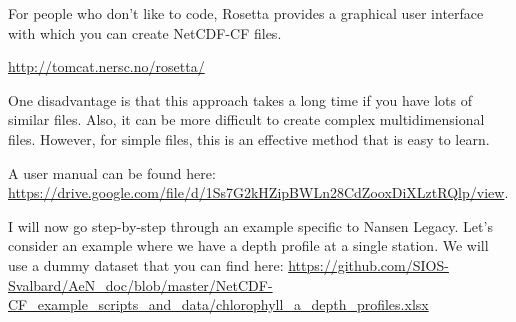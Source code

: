 \documentclass[a4paper,english, 11pt]{article}
\begin{document}
For people who don't like to code, Rosetta provides a graphical user interface with which you can create NetCDF-CF files.

\url{http://tomcat.nersc.no/rosetta/}

One disadvantage is that this approach takes a long time if you have lots of similar files. Also, it can be more difficult to create complex multidimensional files. However, for simple files, this is an effective method that is easy to learn.

A user manual can be found here:
\url{https://drive.google.com/file/d/1Ss7G2kHZipBWLn28CdZooxDiXLztRQlp/view}.

I will now go step-by-step through an example specific to Nansen Legacy. Let's consider an example where we have a depth profile at a single station. We will use a dummy dataset that you can find here:
\url{https://github.com/SIOS-Svalbard/AeN_doc/blob/master/NetCDF-CF_example_scripts_and_data/chlorophyll_a_depth_profiles.xlsx}
\end{document}
